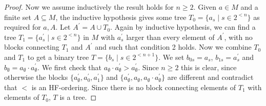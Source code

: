 \documentclass[10pt,a4paper]{amsart}
\begin{document}
\begin{proof}
	
	Now we assume inductively the result holds for $n\geq 2$.
	Given $a\in M$ and a finite set $A\subseteq M$, the inductive hypothesis gives some tree $T_0=\{a_s\mid s\in 2^{<n}\}$ as required for $a,A$.  Let $A^\prime =A\cup T_0$. Again by inductive hypothesis, we can find a tree $T_1=\{a^\prime_s\mid s\in 2^{<n}\}$ in $M$  with $a^\prime_s$ larger than every element of $A^\prime$, with no blocks connecting $T_1$ and $A^\prime$  and such that condition 2 holds. Now we combine $T_0$ and $T_1$ to get a binary tree $T=\{b_s \mid s\in 2^{<n+1}\}$. We set $b_{0s}= a_s$, $b_{1s}= a^\prime_s$  and  $b_\emptyset = a_\emptyset\cdot a^\prime_\emptyset$.  We first  check that   $a_\emptyset\cdot a^\prime_\emptyset > a^\prime_\emptyset$. Since $n\geq 2$ this is clear, since otherwise the blocks $\{a^\prime_\emptyset,a^\prime_0,a^\prime_1\}$  and  $\{a^\prime_\emptyset, a_\emptyset, a_\emptyset \cdot a^\prime_\emptyset\}$ are different and contradict that $<$ is an HF-ordering. Since there is no block connecting elements of $T_1$ with elements of $T_0$, $T$ is a tree.
\end{proof}
\end{document}
